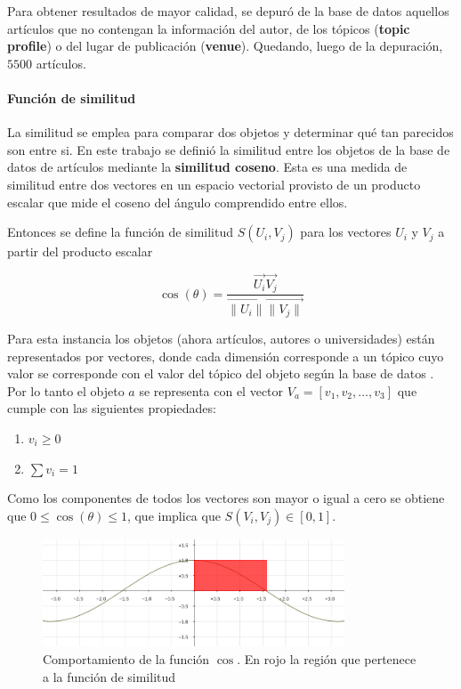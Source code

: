 Para obtener resultados de mayor calidad, se depuró de la base de datos aquellos artículos que no contengan la información del autor, de los tópicos (\textbf{topic profile}) o del lugar de publicación (\textbf{venue}). Quedando, luego de la depuración, $5500$ artículos.  

\paragraph{Función de similitud}
La similitud se emplea para comparar dos objetos y determinar qué tan parecidos son entre si. En este trabajo se definió la similitud entre los objetos de la base de datos de artículos mediante la \textbf{similitud coseno}. Esta es una medida de similitud entre dos vectores en un espacio vectorial provisto de un producto escalar que mide el coseno del ángulo comprendido entre ellos.

Entonces se define la función de similitud $S(U_i, V_j)$ para los vectores $U_i$ y $V_j$ a partir del producto escalar

\begin{equation} \label{eq:angulovectorial}
\cos(\theta) =  \dfrac{\overrightarrow{U_i} \overrightarrow{V_j}}{\overrightarrow{\lVert U_i\lVert} \overrightarrow{\lVert V_j\lVert}}
\end{equation}

Para esta instancia los objetos (ahora artículos, autores o universidades) están representados por vectores, donde cada dimensión corresponde a un tópico cuyo valor se corresponde con el valor del tópico del objeto según la base de datos \cite{dataDrive}. Por lo tanto el objeto $a$ se representa con el vector $V_a = [v_1,v_2,...,v_3]$ que cumple con las siguientes propiedades:
\begin{enumerate}
 \item $v_i \geq 0$
 \item $\sum{v_i} = 1$
\end{enumerate}

Como los componentes de todos los vectores son mayor o igual a cero se obtiene que $0\leq\cos(\theta)\leq1$, que implica que $S(V_i, V_j) \in \left[0, 1\right]$.

\begin{figure}[H]
\includegraphics[width=0.8\textwidth]{img/coseno.png}
\caption{Comportamiento de la función $\cos$. En rojo la región que pertenece a la función de similitud}
\label{bus:img-coseno}
\end{figure}

